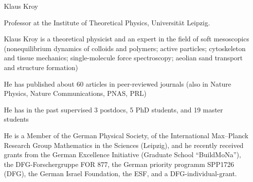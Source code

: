 \begin{participant}[type=R,PM=12,gender=male,salary=5500]{Klaus Kroy}

Professor at the Institute of Theoretical Physics, Universität Leipzig.

Klaus Kroy is a theoretical physicist and an expert in the field of
soft mesoscopics (nonequilibrium dynamics of colloids and polymers; active particles; cytoskeleton and tissue mechanics; single-molecule force spectroscopy; aeolian sand transport and structure formation)

He has published about 60 articles in peer-reviewed journals (also in
Nature Physics, Nature Communications, PNAS, PRL) 

He has in the past supervised 3 postdocs, 5 PhD students, and 19
master students 

He is a Member of the German Physical Society, of the International Max--Planck Research Group
Mathematics in the Sciences (Leipzig), and he recently received grants from
the German Excellence Initiative (Graduate School ``BuildMoNa''),
the DFG-Forschergruppe FOR 877, the German
priority programm SPP1726 (DFG), the German Israel
Foundation, the ESF, and a DFG-individual-grant.


\end{participant}

